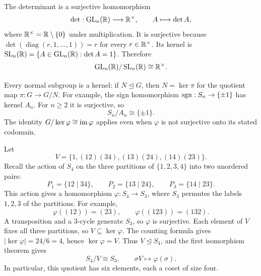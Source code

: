 \documentclass[reqno,11pt]{amsart}
\begin{document}
\begin{example}
The determinant is a surjective homomorphism
\[
  \det:\operatorname{GL}_n(\mathbb{R})\longrightarrow\mathbb{R}^\times,
  \qquad A\longmapsto\det A,
\]
where $\mathbb{R}^\times=\mathbb{R}\setminus\{0\}$ under multiplication.
It is surjective because
$\det(\operatorname{diag}(r,1,\ldots,1))=r$ for every
$r\in\mathbb{R}^\times$. Its kernel is
$\operatorname{SL}_n(\mathbb{R})=\{A\in\operatorname{GL}_n(\mathbb{R}):\det A=1\}$. Therefore
\[
  \operatorname{GL}_n(\mathbb{R})/\operatorname{SL}_n(\mathbb{R})\cong\mathbb{R}^\times.
\]
\end{example}

\begin{example}
Every normal subgroup is a kernel: if $N\trianglelefteq G$, then
$N=\ker\pi$ for the quotient map $\pi:G\to G/N$.
For example, the sign homomorphism
$\operatorname{sgn}:S_n\to\{\pm1\}$ has kernel $A_n$. For $n\geq2$ it is
surjective, so
\[
  S_n/A_n\cong\{\pm1\}.
\]
The identity $G/\ker\varphi\cong\operatorname{im}\varphi$ applies even when
$\varphi$ is not surjective onto its stated codomain.
\end{example}

\begin{example}[A quotient of $S_4$]
Let
\[
  V=\{1,(12)(34),(13)(24),(14)(23)\}.
\]
Recall the action of $S_4$ on the three partitions of
$\{1,2,3,4\}$ into two unordered pairs:
\[
  P_1=\{12\mid34\},\qquad
  P_2=\{13\mid24\},\qquad
  P_3=\{14\mid23\}.
\]
This action gives a homomorphism $\varphi:S_4\to S_3$, where
$S_3$ permutes the labels $1,2,3$ of the partitions. For example,
\[
  \varphi((12))=(23),\qquad \varphi((123))=(132).
\]
A transposition and a $3$-cycle generate $S_3$, so $\varphi$ is
surjective. Each element of $V$ fixes all three partitions, so
$V\subseteq\ker\varphi$. The counting formula gives
$|\ker\varphi|=24/6=4$, hence $\ker\varphi=V$.
Thus $V\trianglelefteq S_4$, and the first isomorphism theorem gives
\[
  S_4/V\cong S_3,\qquad \sigma V\longmapsto\varphi(\sigma).
\]
In particular, this quotient has six elements, each a coset of size four.
\end{example}
\end{document}
